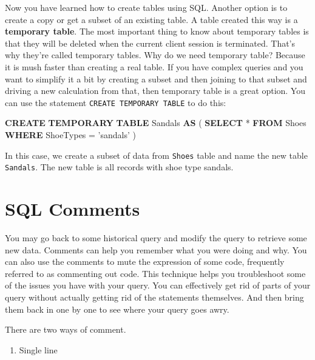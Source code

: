 \documentclass[]{book}
\newenvironment{Shaded}{\begin{snugshade}}{\end{snugshade}}
\newcommand{\KeywordTok}[1]{\textcolor[rgb]{0.13,0.29,0.53}{\textbf{{#1}}}}
\newcommand{\StringTok}[1]{\textcolor[rgb]{0.31,0.60,0.02}{{#1}}}
\newcommand{\NormalTok}[1]{{#1}}
\providecommand{\tightlist}{%
  \setlength{\itemsep}{0pt}\setlength{\parskip}{0pt}}
\theoremstyle{definition}
\theoremstyle{definition}
\theoremstyle{remark}
\begin{document}
Now you have learned how to create tables using SQL. Another option is
to create a copy or get a subset of an existing table. A table created
this way is a \textbf{temporary table}. The most important thing to know
about temporary tables is that they will be deleted when the current
client session is terminated. That's why they're called temporary
tables. Why do we need temporary table? Because it is mush faster than
creating a real table. If you have complex queries and you want to
simplify it a bit by creating a subset and then joining to that subset
and driving a new calculation from that, then temporary table is a great
option. You can use the statement \texttt{CREATE\ TEMPORARY\ TABLE} to
do this:

\begin{Shaded}
\begin{Highlighting}[]
\KeywordTok{CREATE} \KeywordTok{TEMPORARY} \KeywordTok{TABLE} \NormalTok{Sandals }\KeywordTok{AS}
\NormalTok{(}
\KeywordTok{SELECT} \NormalTok{*}
\KeywordTok{FROM} \NormalTok{Shoes}
\KeywordTok{WHERE} \NormalTok{ShoeTypes = }\StringTok{'sandals'}
\NormalTok{)}
\end{Highlighting}
\end{Shaded}

In this case, we create a subset of data from \texttt{Shoes} table and
name the new table \texttt{Sandals}. The new table is all records with
shoe type sandals.

\section{SQL Comments}\label{sql-comments}

You may go back to some historical query and modify the query to
retrieve some new data. Comments can help you remember what you were
doing and why. You can also use the comments to mute the expression of
some code, frequently referred to as commenting out code. This technique
helps you troubleshoot some of the issues you have with your query. You
can effectively get rid of parts of your query without actually getting
rid of the statements themselves. And then bring them back in one by one
to see where your query goes awry.

There are two ways of comment.

\begin{enumerate}
\def\labelenumi{(\arabic{enumi})}
\tightlist
\item
  Single line
\end{enumerate}
\end{document}
